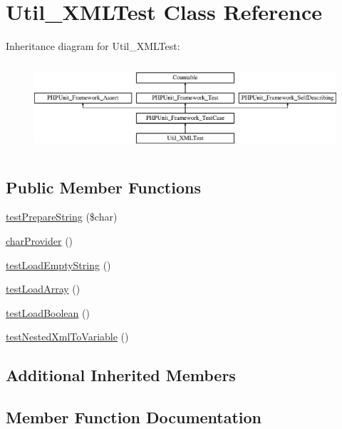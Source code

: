 \hypertarget{class_util___x_m_l_test}{}\section{Util\+\_\+\+X\+M\+L\+Test Class Reference}
\label{class_util___x_m_l_test}
Inheritance diagram for Util\+\_\+\+X\+M\+L\+Test\+:\begin{figure}[H]
\begin{center}
\leavevmode
\includegraphics[height=3.303835cm]{class_util___x_m_l_test}
\end{center}
\end{figure}
\subsection*{Public Member Functions}
\begin{DoxyCompactItemize}
\item 
\mbox{\hyperlink{class_util___x_m_l_test_a85db052a8b7b19c3d78ae132a248c4d0}{test\+Prepare\+String}} (\$char)
\item 
\mbox{\hyperlink{class_util___x_m_l_test_a4e93c70b6f005663c351ba207ae5d996}{char\+Provider}} ()
\item 
\mbox{\hyperlink{class_util___x_m_l_test_a003f67fb344be05c75439a6b7c55c8a9}{test\+Load\+Empty\+String}} ()
\item 
\mbox{\hyperlink{class_util___x_m_l_test_af53e2a108e2e42a402ae6e8ef2a2c794}{test\+Load\+Array}} ()
\item 
\mbox{\hyperlink{class_util___x_m_l_test_a218e225229aa8e1d8bf11f717fa01c26}{test\+Load\+Boolean}} ()
\item 
\mbox{\hyperlink{class_util___x_m_l_test_ac4a6fe05351df12cadf1a98dfdebddd0}{test\+Nested\+Xml\+To\+Variable}} ()
\end{DoxyCompactItemize}
\subsection*{Additional Inherited Members}


\subsection{Member Function Documentation}
\mbox{\label{class_util___x_m_l_test_a4e93c70b6f005663c351ba207ae5d996}} 
